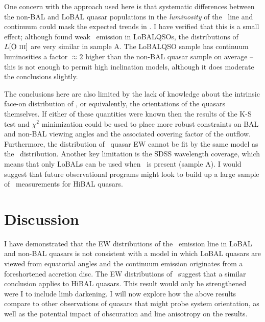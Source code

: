 One concern with the approach used here is that systematic differences between the
non-BAL and LoBAL quasar populations in the {\em luminosity} of the \oiiifull\ line 
and continuum could mask the expected trends in \ewo. I have verified that this is a 
small effect; although \cite{boroson1992} found weak \oiiifull\ emission in LoBALQSOs,
the distributions of $L[\mathrm{O~\textsc{iii}}]$ are very similar in sample A. 
The LoBALQSO sample has continuum luminosities a factor $\approx2$ higher than the
non-BAL quasar sample on average -- this is not enough to
permit high inclination models, although it does moderate the conclusions slightly.

The conclusions here are also limited by the lack of knowledge about the 
intrinsic face-on distribution of \ewo, or equivalently,
the orientations of the quasars themselves. If either of these
quantities were known then the results of the
K-S test and $\chi^2$ minimization could be used
to place more robust constraints on BAL and non-BAL viewing angles 
and the associated covering factor of the outflow.
Furthermore, the distribution of \civ\ quasar EW cannot be fit by 
the same model as the \ewo\ distribution.
Another key limitation is the SDSS wavelength coverage,
which means that only LoBALs can be used when \ewo\ is present (sample A).
I would suggest that future observational programs might 
look to build up a large sample of \ewo\ measurements for HiBAL
quasars. 










\section{Discussion}
\label{sec:discuss_ew}
I have demonstrated that the EW distributions of the 
\oiiifull\ emission line in LoBAL and non-BAL
quasars is not consistent with a 
model in which LoBAL quasars are viewed from equatorial angles 
and the continuum emission originates from
a foreshortened accretion disc. The EW distributions of 
\civline\ suggest that a similar conclusion applies to HiBAL quasars.
This result would only be strengthened were 
I to include limb darkening. I will now explore how the above results compare to other
observations of quasars that might probe system orientation, as 
well as the potential impact of obscuration and line anisotropy
on the results.

